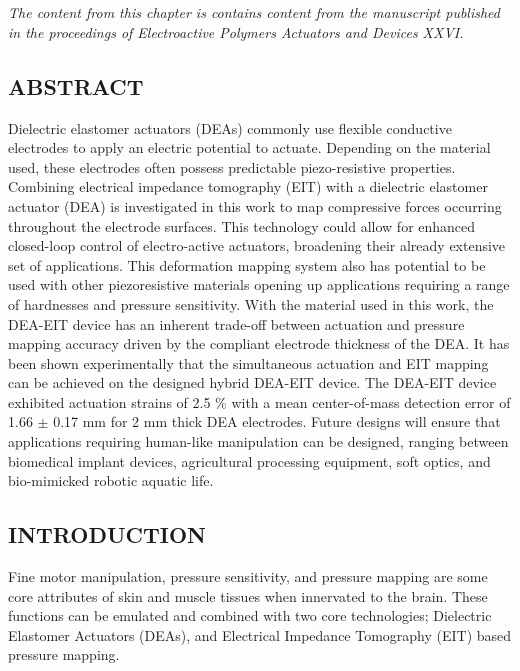 \chapter{\chapvname}
\label{chapter5}
\textit{The content from this chapter is contains content from the manuscript published in the proceedings of Electroactive Polymers Actuators and Devices XXVI.}

\section*{ABSTRACT}
	Dielectric elastomer actuators (DEAs) commonly use flexible conductive electrodes to apply an electric potential to actuate. Depending on the material used, these electrodes often possess predictable piezo-resistive properties. Combining electrical impedance tomography (EIT) with a dielectric elastomer actuator (DEA) is investigated in this work to map compressive forces occurring throughout the electrode surfaces. This technology could allow for enhanced closed-loop control of electro-active actuators, broadening their already extensive set of applications. This deformation mapping system also has potential to be used with other piezoresistive materials opening up applications requiring a range of hardnesses and pressure sensitivity. With the material used in this work, the DEA-EIT device has an inherent trade-off between actuation and pressure mapping accuracy driven by the compliant electrode thickness of the DEA. It has been shown experimentally that the simultaneous actuation and EIT mapping can be achieved on the designed hybrid DEA-EIT device. The DEA-EIT device exhibited actuation strains of 2.5 \% with a mean center-of-mass detection error of 1.66 $\pm$ 0.17 mm for 2 mm thick DEA electrodes. Future designs will ensure that applications requiring human-like manipulation can be designed, ranging between biomedical implant devices, agricultural processing equipment, soft optics, and bio-mimicked robotic aquatic life. 



\section{INTRODUCTION} %
\label{sec:introduction}
Fine motor manipulation, pressure sensitivity, and pressure mapping are some core attributes of skin and muscle tissues when innervated to the brain. These functions can be emulated and combined with two core technologies; Dielectric Elastomer Actuators (DEAs), and Electrical Impedance Tomography (EIT) based pressure mapping.

